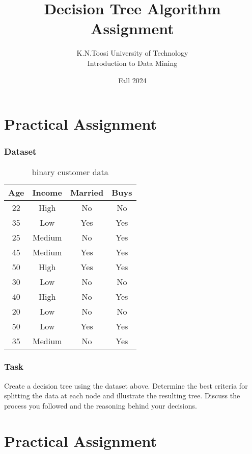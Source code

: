 \documentclass{article}
\begin{document}
	
	\title{Decision Tree Algorithm Assignment}
	\author{K.N.Toosi University of Technology\\Introduction to Data Mining}
	\date{Fall 2024}
	\maketitle
	\newpage
	\part{Practical Assignment}
	\section*{Dataset}
	\begin{table}[h]
	\centering
	\begin{tabular}{cccc}
		\toprule
		Age & Income & Married & Buys \\
		\midrule
		22 & High & No & No \\
		35 & Low & Yes & Yes \\
		25 & Medium & No & Yes \\
		45 & Medium & Yes & Yes \\
		50 & High & Yes & Yes \\
		30 & Low & No & No \\
		40 & High & No & Yes \\
		20 & Low & No & No \\
		50 & Low & Yes & Yes \\
		35 & Medium & No & Yes \\
		\bottomrule
	\end{tabular}
	\caption{binary customer data}
	\end{table}
	\section*{Task}
	Create a decision tree using the dataset above. Determine the best criteria for splitting the data at each node and illustrate the resulting tree. Discuss the process you followed and the reasoning behind your decisions.
	\part{Practical Assignment}
\end{document}
